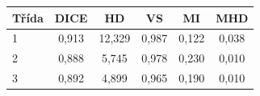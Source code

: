 \begin{tabular}{l c c c c c}
 \hline
Třída & DICE & HD & VS & MI & MHD \\ \hline
1 & 0,913 & 12,329 & 0,987 & 0,122 & 0,038 \\
2 & 0,888 & 5,745 & 0,978 & 0,230 & 0,010 \\
3 & 0,892 & 4,899 & 0,965 & 0,190 & 0,010 \\
\hline 
 \end{tabular}
